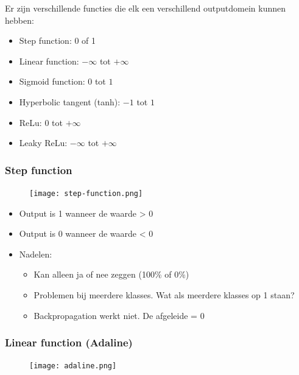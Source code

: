 \documentclass{article}
\begin{document}
Er zijn verschillende functies die elk een verschillend outputdomein kunnen hebben:

\begin{itemize}
    \item Step function: 0 of 1
    \item Linear function: $-\infty$ tot $+\infty$
    \item Sigmoid function: $0$ tot $1$
    \item Hyperbolic tangent (tanh): $-1$ tot $1$
    \item ReLu: $0$ tot $+\infty$
    \item Leaky ReLu: $-\infty$ tot $+\infty$
\end{itemize}

\subsubsection{Step function}

\begin{figure}[H]
    \centering
    \texttt{[image: step-function.png]}
\end{figure}

\begin{itemize}
    \item Output is 1 wanneer de waarde > 0
    \item Output is 0 wanneer de waarde < 0
    \item Nadelen:
    \begin{itemize}
        \item Kan alleen ja of nee zeggen (100\% of 0\%)
        \item Problemen bij meerdere klasses. Wat als meerdere klasses op 1 staan?
        \item Backpropagation werkt niet. De afgeleide = 0
    \end{itemize}
\end{itemize}


\subsubsection{Linear function (Adaline)}

\begin{figure}[H]
    \centering
    \texttt{[image: adaline.png]}
\end{figure}
\end{document}
